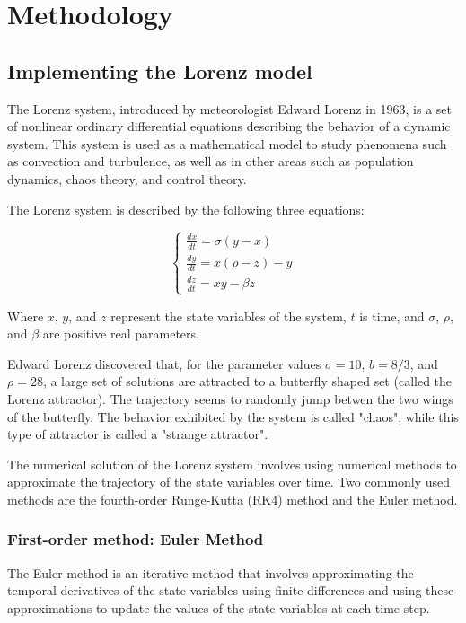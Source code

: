 \documentclass{article}
\begin{document}
 \section{Methodology}
 \subsection{Implementing the Lorenz model}


 The Lorenz system\cite{lorenz1963deterministic}, introduced by meteorologist Edward Lorenz in 1963, 
 is a set of nonlinear ordinary differential equations describing the behavior of a dynamic system. 
 This system is used as a mathematical model to study phenomena such as convection and turbulence, 
 as well as in other areas such as population dynamics, chaos theory, and control theory.



 The Lorenz system is described by the following three equations:

 \[
\left\{
\begin{array}{ccc}
\frac{dx}{dt} = \sigma(y - x) \\
\frac{dy}{dt} = x(\rho - z) - y \\
\frac{dz}{dt} = xy - \beta z
\end{array}
\right.
\]

Where $x$, $y$, and $z$ represent the state variables of the system, 
$t$ is time, and $\sigma$, $\rho$, and $\beta$ are positive real parameters.

Edward Lorenz discovered that, for the parameter values 
$\sigma = 10$, $b = 8/3$, and $\rho = 28$, a large set of solutions are attracted to a butterfly shaped set (called the Lorenz attractor). 
The trajectory seems to randomly jump betwen the two wings of the butterfly. 
The behavior exhibited by the system is called "chaos", while this type of attractor is called a "strange attractor". 

The numerical solution of the Lorenz system involves using numerical methods to approximate the trajectory of the state variables over time. 
Two commonly used methods are the fourth-order Runge-Kutta (RK4) method and the Euler method.

\subsubsection{First-order method: Euler Method}
The Euler method is an iterative method that involves approximating the temporal derivatives 
of the state variables using finite differences and using these approximations to update the values of the state variables at each time step. 
\end{document}

